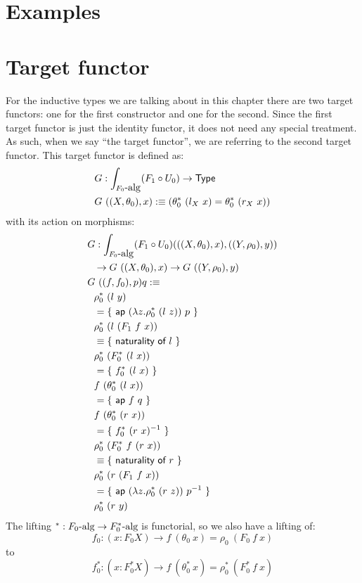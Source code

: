 \documentclass[a4paper,10pt]{report}
\begin{document}
\section{Examples}


\section{Target functor}

For the inductive types we are talking about in this chapter there are
two target functors: one for the first constructor and one for the
second. Since the first target functor is just the identity functor,
it does not need any special treatment. As such, when we say ``the
target functor'', we are referring to the second target functor. This
target functor is defined as:
%
\begin{align*}
&G : \int_{\algcat{F_0}} (F_1 \circ U_0) \to \Type \\
&G\ ((X,\theta_0), x) \ddefeq (\theta_0^*\ (l_{X}\ x) = \theta_0^*\ (r_{X}\ x))
\end{align*}
%
with its action on morphisms:
%
\begin{align*}
&G : \int_{F_0\mbox{-alg}} (F_1 \circ U_0) (((X,\theta_0),x),((Y,\rho_0),y)) \\
&\ \ \to G\ ((X,\theta_0),x) \to G\ ((Y,\rho_0),y) \\
&G\ ((f,f_0),p) q :\equiv \\
&\ \ \rho_0^*\ (l\ y) \\
&\ \ = \{\ \mathsf{ap}\ (\lambda z . \rho_0^*\ (l\ z))\ p\ \} \\
&\ \ \rho_0^*\ (l\ (F_1\ f\ x)) \\
&\ \ \equiv \{\ \textsf{naturality of $l$}\ \} \\
&\ \ \rho_0^*\ (F_0^*\ (l\ x)) \\
&\ \ = \{\ f_0^*\ (l\ x)\ \} \\
&\ \ f\ (\theta_0^*\ (l\ x)) \\
&\ \ = \{\ \mathsf{ap}\ f\ q\ \} \\
&\ \ f\ (\theta_0^*\ (r\ x)) \\
&\ \ = \{\ f_0^*\ (r\ x)^{-1}\ \} \\
&\ \ \rho_0^*\ (F_0^*\ f\ (r\ x)) \\
&\ \ \equiv \{\ \textsf{naturality of $r$}\ \} \\
&\ \ \rho_0^*\ (r\ (F_1\ f\ x)) \\
&\ \ = \{\ \mathsf{ap}\ (\lambda z . \rho_0^*\ (r\ z))\ p^{-1}\ \} \\
&\ \ \rho_0^*\ (r\ y)
\end{align*}
%
The lifting $^* : F_0\mbox{-alg} \to F_0^*\mbox{-alg}$ is functorial, so
we also have a lifting of:
$$
f_0 : (x : F_0 X) \to f\ (\theta_0\ x) = \rho_0\ (F_0\ f\ x)
$$
to
$$
f_0^* : (x : F_0^* X) \to f\ (\theta_0^*\ x) = \rho_0^*\ (F_0^*\ f\ x)
$$
\end{document}
